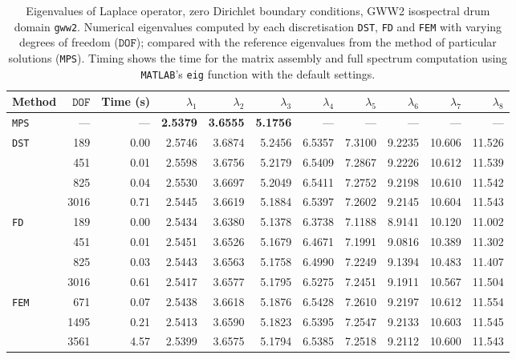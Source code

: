 %

\begin{table}[htbp]
  \centering
  {\scriptsize
  \begin{tabular}{lrrrrrrrrrr}
    \toprule
    Method & $\mathtt{DOF}$ & Time (s) & $\lambda_{1}$ & $\lambda_{2}$ & $\lambda_{3}$ & $\lambda_{4}$ & $\lambda_{5}$ & $\lambda_{6}$ & $\lambda_{7}$ & $\lambda_{8}$ \\
    \midrule
    \texttt{MPS} & --- & --- & \textbf{2.5379} & \textbf{3.6555} & \textbf{5.1756} & --- & --- & --- & --- & --- \\
    \midrule
    \multirow{4}{*}{\texttt{DST}} & 189 & 0.00 & 2.5746 & 3.6874 & 5.2456 & 6.5357 & 7.3100 & 9.2235 & 10.606 & 11.526 \\
     & 451 & 0.01 & 2.5598 & 3.6756 & 5.2179 & 6.5409 & 7.2867 & 9.2226 & 10.612 & 11.539 \\
     & 825 & 0.04 & 2.5530 & 3.6697 & 5.2049 & 6.5411 & 7.2752 & 9.2198 & 10.610 & 11.542 \\
     & 3016 & 0.71 & 2.5445 & 3.6619 & 5.1884 & 6.5397 & 7.2602 & 9.2145 & 10.604 & 11.543 \\
    \midrule
    \multirow{4}{*}{\texttt{FD}} & 189 & 0.00 & 2.5434 & 3.6380 & 5.1378 & 6.3738 & 7.1188 & 8.9141 & 10.120 & 11.002 \\
     & 451 & 0.01 & 2.5451 & 3.6526 & 5.1679 & 6.4671 & 7.1991 & 9.0816 & 10.389 & 11.302 \\
     & 825 & 0.03 & 2.5443 & 3.6563 & 5.1758 & 6.4990 & 7.2249 & 9.1394 & 10.483 & 11.407 \\
     & 3016 & 0.61 & 2.5417 & 3.6577 & 5.1795 & 6.5275 & 7.2451 & 9.1911 & 10.567 & 11.504 \\
    \midrule
    \multirow{3}{*}{\texttt{FEM}} & 671 & 0.07 & 2.5438 & 3.6618 & 5.1876 & 6.5428 & 7.2610 & 9.2197 & 10.612 & 11.554 \\
     & 1495 & 0.21 & 2.5413 & 3.6590 & 5.1823 & 6.5395 & 7.2547 & 9.2133 & 10.603 & 11.545 \\
     & 3561 & 4.57 & 2.5399 & 3.6575 & 5.1794 & 6.5385 & 7.2518 & 9.2112 & 10.600 & 11.543 \\
    \bottomrule
  \end{tabular}}
  \caption{Eigenvalues of Laplace operator, zero Dirichlet boundary conditions, GWW2 isospectral drum domain \texttt{gww2}. Numerical eigenvalues computed by each discretisation \texttt{DST}, \texttt{FD} and \texttt{FEM} with varying degrees of freedom ($\mathtt{DOF}$); compared with the reference eigenvalues from the method of particular solutions (\texttt{MPS}). Timing shows the time for the matrix assembly and full spectrum computation using \texttt{MATLAB}'s \lstinline{eig} function with the default settings.}
  \label{tab:eigenvalues_head_gww2}
\end{table}
